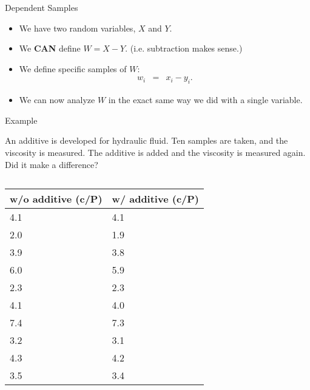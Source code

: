 \begin{frame}{Dependent Samples}

  \begin{itemize}
  \item We have two random variables, $X$ and $Y$.
  \item We \textbf{CAN} define $W=X-Y$. (i.e. subtraction makes
    sense.)
  \item We define specific samples of $W$:
    \begin{eqnarray*}
      w_i & = & x_i - y_i.
    \end{eqnarray*}
  \item We can now analyze $W$ in the exact same way we did with a
    single variable.
  \end{itemize}
  
\end{frame}

\begin{frame}{Example}

  An additive is developed for hydraulic fluid. Ten samples are taken,
  and the viscosity is measured. The additive is added and the
  viscosity is measured again. Did it make a difference?

  \begin{columns}

    \begin{tabular}{ll}
      w/o additive (c/P) & w/ additive (c/P)  \\\hline
      4.1 & 4.1 \\
      2.0 & 1.9 \\
      3.9 & 3.8 \\
      6.0 & 5.9 \\
      2.3 & 2.3 \\
      4.1 & 4.0 \\
      7.4 & 7.3 \\
      3.2 & 3.1 \\
      4.3 & 4.2 \\
      3.5 & 3.4
    \end{tabular}



  \end{columns}
  
\end{frame}

